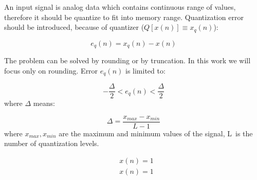An input signal is analog data which contains continuous range of values, therefore it should be quantize to fit into memory range. Quantization error should be introduced, because of quantizer ($Q[x(n)] \equiv x_q(n)$):

\begin{equation}
e_q(n) = x_q(n) - x(n)
\end{equation}

The problem can be solved by rounding or by truncation. In this work we will focus only on rounding. Error $e_q(n)$ is limited to:


\begin{equation}
	-\frac{\Delta}{2} < e_q(n) < \frac{\Delta}{2}
\end{equation}
where $\Delta$ means:

\begin{equation}
	\Delta = \frac{x_{max}-x_{min}}{L-1}
\end{equation}
where $x_{max}, x_{min}$ are the maximum and minimum values of the signal, L~is the number of quantization levels.


\begin{align}
	& x(n) = 1 \\
	& x(n) = 1 
\end{align}



